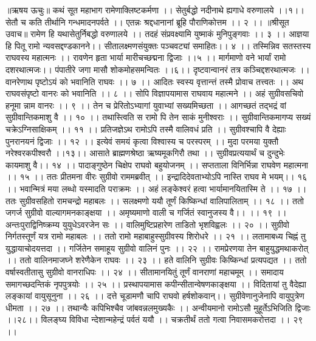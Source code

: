 ॥ऋषय ऊचुः॥
कथं सूत महाभाग रामेणाक्लिष्टकर्मणा ।।
सेतुर्बद्धो नदीनाथे ह्यगाधे वरुणालये ।।१।।
सेतौ च कति तीर्थानि गन्धमादनपर्वते ।।
एतन्नः श्रद्दधानानां ब्रूहि पौराणिकोत्तम ।। २ ।।
॥श्रीसूत उवाच॥
रामेण हि यथासेतुर्निबद्धो वरुणालये ।।
तदहं संप्रवक्ष्यामि युष्माकं मुनिपुङ्गवाः ।। ३ ।।
आज्ञया हि पितू रामो न्यवसद्दण्डकानने।।
सीतालक्ष्मणसंयुक्तः पञ्चवट्यां समाहितः।। ४ ।।
तस्मिन्निव सतस्तस्य राघवस्य महात्मनः ।।
रावणेन हृता भार्या मारीचच्छद्मना द्विजाः ।।५ ।।
मार्गमाणो वने भार्यां रामो दशरथात्मजः।।
पंपातीरे जगा मासौ शोकमोहसमन्वितः ।।६।।
दृष्टवान्वानरं तत्र कञ्चिद्दशरथात्मजः ।।
वानरेणाथ पृष्टोऽयं को भवानिति राघवः ।। ७ ।।
आदितः स्वस्य वृत्तान्त्तं तस्मै प्रोवाच तत्त्वतः ।।
अथ राघवसंपृष्टो वानरः को भवानिति ।। ८ ।।
सोपि विज्ञापयामास राघवाय महात्मने ।।
अहं सुग्रीवसचिवो हनूमा न्नाम वानरः ।। ९ ।।
तेन च प्रेरितोऽभ्यागां युवाभ्यां सख्यमिच्छता ।।
आगच्छतं तद्भद्रं वां सुग्रीवान्तिकमाशु वै ।। १० ।।
तथास्त्विति स रामो पि तेन साकं मुनीश्वराः ।।
सुग्रीवान्तिकमागप्य सख्यं चक्रेऽग्निसाक्षिकम् ।। ११ ।।
प्रतिजज्ञेऽथ रामोऽपि तस्मै वालिवधं प्रति ।।
सुग्रीवश्चापि वै देह्याः पुनरानयनं द्विजाः ।। १२ ।।
इत्येवं समयं कृत्वा विश्वास्य च परस्परम् ।।
मुदा परमया युक्तौ नरेश्वरकपीश्वरौ ।।१३।।
आसाते ब्राह्मणश्रेष्ठा ऋष्यमूकगिरौ तथा ।।
सुग्रीवप्रत्ययार्थं च दुन्दुभेः कायमाशु वै।। १४ ।।
पादाङ्गुष्ठेन चिक्षेप राघवो बहुयोजनम् ।।
सप्तताला विनिर्भिन्ना राघवेण महात्मना ।। १५ ।।
ततः प्रीतमना वीरः सुग्रीवो राममब्रवीत् ।।
इन्द्रादिदेवताभ्योऽपि नास्ति राघव मे भयम्।। १६ ।।
भवान्मित्रं मया लब्धो यस्मादति पराक्रमः ।।
अहं लङ्केश्वरं हत्वा भार्यामानयितास्मि ते ।। १७ ।।
ततः सुग्रीवसहितो रामचन्द्रो महाबलः ।।
सलक्ष्मणो ययौ तूर्णं किष्किन्धां वालिपालिताम् ।। १८ ।।
ततो जगर्ज सुग्रीवो वाल्यागमनकाङ्क्षया ।।
अमृष्यमाणो वाली च गर्जितं स्वानुजस्य वै।। ।। १९ ।।
अन्तःपुराद्विनिष्क्रम्य युयुधेऽवरजेन सः ।।
वालिमुष्टिप्रहारेण ताडितो भृशविह्वलः ।। २० ।।
सुग्रीवो निर्गतस्तूर्णं यत्र रामो महाबलः ।।
ततो रामो महाबाहुस्सुग्रीवस्य शिरोधरे ।। २१ ।।
लतामाबध्य चिह्नं तु युद्धायाचोदयत्तदा ।।
गर्जितेन समाहूय सुग्रीवो वालिनं पुनः ।। २२ ।।
रामप्रेरणया तेन बाहुयुद्धमथाकरोत् ।।
ततो वालिनमाजघ्ने शरेणैकेन राघवः ।। २३ ।।
हते वालिनि सुग्रीवः किष्किन्धां प्रत्यपद्यत ।।
ततो वर्षास्वतीतासु सुग्रीवो वानराधिपः ।। २४ ।।
सीतामानयितुं तूर्णं वानराणां महाचमूम् ।।
समादाय समागच्छदन्तिकं नृपपुत्रयोः ।। २५ ।।
प्रस्थापयामास कपीन्सीतान्वेषणकाङ्क्षया ।।
विदितायां तु वैदेह्या लङ्कायां वायुसूनुना ।। २६ ।।
दत्ते चूडामणौ चापि राघवो हर्षशोकवान्।।
सुग्रीवेणानुजेनापि वायुपुत्रेण धीमता ।। २७ ।।
तथान्यैः कपिभिश्चैव जांबवन्नलमुख्यकैः ।।
अन्वीयमानो रामोऽसौ मुहूर्तेऽभिजिति द्विजाः ।।२८।।
विलङ्घ्य विविधा न्देशान्महेन्द्रं पर्वतं ययौ ।।
चक्रतीर्थं ततो गत्वा निवासमकरोत्तदा ।। २९ ।।
